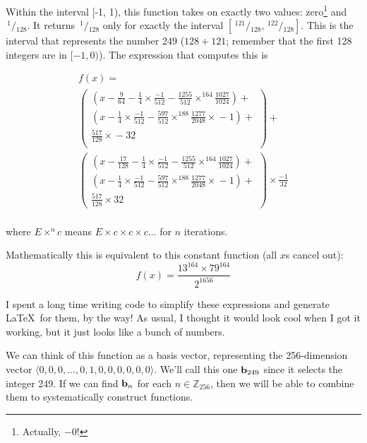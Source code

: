 \documentclass[twocolumn]{article}
\newcommand\sfrac[2]{\!{}\,^{#1}\!/{}\!_{#2}}
\newcommand\basis{\ensuremath{\textrm{\bf b}}}
\begin{document}

Within the interval [-1, 1), this function takes on exactly two
  values: zero\footnote{Actually, $-0$!} and $\sfrac{1}{128}$. It returns
  $\sfrac{1}{128}$ only for exactly the interval $[\sfrac{121}{128},
    \sfrac{122}{128}]$. This is the interval that represents the
  number 249 ($128 + 121$; remember that the first 128 integers are in
  $[-1, 0)$). The expression that computes this is

\[
\begin{array}{l}
  f(x) = \\[0.5em]
  \left(
  \begin{array}{l}
    (x - \frac{9}{64} - \frac{1}{4} \times{} \frac{-1}{512} - \frac{1255}{512} \times^{\scriptscriptstyle 164} \frac{1027}{1024}) + \\[0.5em]
    (x - \frac{1}{4} \times{} \frac{-1}{512} - \frac{597}{512} \times^{\scriptscriptstyle 188} \frac{1277}{2048} \times{} -1) + \\[0.5em]
    \frac{517}{128} \times{} -32 \\[0.5em]
  \end{array}
  \right) + \\[2em]
%
  \left(
  \begin{array}{l}
    (x - \frac{17}{128} - \frac{1}{4} \times{} \frac{-1}{512} - \frac{1255}{512} \times^{\scriptscriptstyle 164} \frac{1027}{1024}) + \\[0.5em]
    (x - \frac{1}{4} \times{} \frac{-1}{512} - \frac{597}{512} \times^{\scriptscriptstyle 188} \frac{1277}{2048} \times{} -1) + \\[0.5em]
    \frac{517}{128} \times{} 32
  \end{array}
  \right) \times{} \frac{-1}{32} \\
\end{array}
\]

where $E \times^{n} c$ means $E \times c \times c \times c \ldots$ for $n$ iterations.

Mathematically this is equivalent to this constant function (all $x$s cancel out):
$$f(x) = \frac{13^{164} \times{} 79^{164}}{2^{1656}}$$

I spent a long time writing code to simplify these expressions and
generate \LaTeX\ for them, by the way! As usual, I thought it would
look cool when I got it working, but it just looks like a bunch of numbers.

We can think of this function as a basis vector, representing the 256-dimension
vector $\langle 0, 0, 0, \ldots, 0, 1, 0, 0, 0, 0, 0, 0 \rangle$. We'll call
this one $\basis_{249}$ since it selects the integer 249. If we can find $\basis_n$
for each $n \in \mathbb{Z}_{256}$, then we will be able to combine them
to systematically construct functions.
\end{document}
